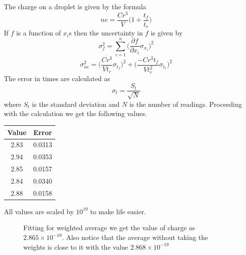 \documentclass[12pt]{article}
\newlength\fwidth
\newlength\fheight
\begin{document}
The charge on a droplet is given by the formula
\[ne =\frac{Cr^3}{V}\bigg(1+\frac{t_f}{t_r} \bigg)\]
If $f$ is a function of $x_i$s then the uncertainty in $f$ is given by
\[\sigma_f^2=\sum_{i = 1}^{n} \bigg(\frac{\partial f}{\partial x_i}\sigma_{x_i}\bigg)^2 \]
\[\sigma_{ne}^2 = \bigg(\frac{Cr^3}{Vt_r}\sigma_{t_f}\bigg)^2+\bigg(\frac{-Cr^3t_f}{Vt_r^2}\sigma_{t_r}\bigg)^2\]
The error in times are calculated as
\[\sigma_t = \frac{S_t}{\sqrt{N}}\] 
where $S_t$ is the standard deviation and $N$ is the number of readings.
Proceeding with the calculation we get the following values.
\begin{table}[H]
    \centering
    \begin{tabular}{|c|c|}
    \hline
        Value & Error \\ \hline
        2.83 & 0.0313 \\ \hline
        2.94 & 0.0353 \\ \hline
        2.85 & 0.0157 \\ \hline
        2.84 & 0.0340 \\ \hline
        2.88 & 0.0158 \\ \hline
    \end{tabular}
\end{table}
\noindent All values are scaled by $10^{19}$ to make life easier.
\begin{figure}[H]
    \centering
    \setlength{}
    \setlength{}
    
    \caption{Fitting for weighted average we get the value of charge as  $2.865 \times 10^{-19}$.
    Also notice that the average without taking the weights is close to it with the value $2.868 \times 10^{-19}$}
\end{figure}
\end{document}
